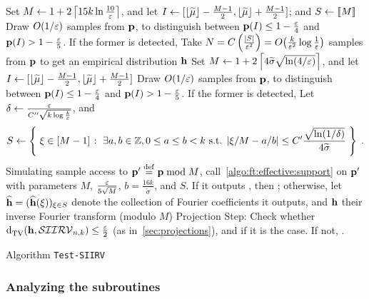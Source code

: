 \begin{algorithm}[ht]
\begin{algorithmic}[1]
    \label{algo:step:small:variance}
        \State\label{algo:step:def:interval:smallvariance} Set $M \gets 1+2\clg{15k \ln\frac{10}{\eps}}$, and let $I \gets [\flr{ \widetilde{\mu} }-\frac{M-1}{2},\flr{ \widetilde{\mu} }+\frac{M-1}{2}]$; and $S\gets \modulo{M}$
        \State\label{algo:step:effectivesupport:smallvariance} Draw $O(1/\eps)$ samples from $\p$, to distinguish between $\p(I) \leq 1-\frac{\eps}{4}$ and $\p(I) > 1-\frac{\eps}{5}$.
        If the former is detected, \Return \reject
        \State\label{algo:step:empirical:smallvariance} Take $N=C\left( \frac{\abs{S}}{\eps^2} \right) = \bigO{ \frac{k}{\eps^2} \log\frac{1}{\eps} }$ samples from $\p$ to get an empirical distribution $\h$
    \Else\label{algo:step:big:variance}
        \State\label{algo:step:def:interval} Set $M \gets 1+2\clg{ 4\widetilde{\sigma}\sqrt{\ln(4/\eps)} }$, and let $I \gets [\flr{ \widetilde{\mu} }-\frac{M-1}{2},\flr{ \widetilde{\mu} }+\frac{M-1}{2}]$
        \State\label{algo:step:effectivesupport} Draw $O(1/\eps)$ samples from $\p$, to distinguish between $\p(I) \leq 1-\frac{\eps}{4}$ and $\p(I) > 1-\frac{\eps}{5}$.
        If the former is detected, \Return \reject
        \State\label{algo:step:dft:computation} Let $\delta\gets \frac{\eps}{C''\sqrt{k\log\frac{k}{\eps}}}$, and 
            \[
              S \gets \setOfSuchThat{ \xi \in [M-1] }{ \exists a, b \in \Z, 0 \leq a \leq b < k \textrm{ s.t. } |\xi/M - a/b| \leq  C'\frac{\sqrt{\ln(1/\delta)}}{4\widetilde{\sigma}} } \;.
            \]
        \State\label{algo:step:fourier:support} Simulating sample access to $\p'\eqdef \p\bmod M$, call~\cref{algo:ft:effective:support} on $\p'$ with parameters $M$, $\frac{\eps}{5\sqrt{M}}$, $b=\frac{16k}{\widetilde{\sigma}}$, and $S$. If it outputs \reject, then \Return \reject; otherwise, let $\fourier{\h}=(\fourier{\h}(\xi))_{\xi\in S}$ denote the collection of Fourier coefficients it outputs, and $\h$ their inverse Fourier transform (modulo $M$) 
    \EndIf
    \State \label{algo:step:cover}\textsf{Projection Step:} Check whether $\totalvardist{\h}{\classksiirv[n]{k}} \leq \frac{\eps}{2}$ (as in~\cref{sec:projections}), and \Return \accept if it is the case. If not, \Return \reject.  
  \end{algorithmic}
  \caption{Algorithm \texttt{Test-SIIRV}}\label{algo:ksiirv:tester}
\end{algorithm}


\subsubsection{Analyzing the subroutines}

